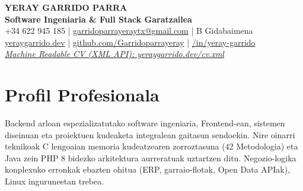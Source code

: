 \documentclass[a4paper,10pt]{article}
\begin{document}
\begin{center}
    {\huge \textbf{YERAY GARRIDO PARRA}} \\ \vspace{4pt}
    {\large \textbf{Software Ingeniaria \& Full Stack Garatzailea}} \\ \vspace{6pt}
    \small
    \faPhone*\hspace{0.5em} +34 622 945 185 \hspace{0.5em} | \hspace{0.5em}
    \faEnvelope \hspace{0.5em} \href{mailto:garridoparrayeraytx@gmail.com}{garridoparrayeraytx@gmail.com} \hspace{0.5em} | \hspace{0.5em}
    \faCar \hspace{0.5em} B Gidabaimena \\ \vspace{3pt}
    \faGlobe \hspace{0.5em} \href{https://yeraygarrido.dev}{yeraygarrido.dev} \hspace{0.5em} | \hspace{0.5em}
    \faGithub \hspace{0.5em} \href{https://github.com/Garridoparrayeray}{github.com/Garridoparrayeray} \hspace{0.5em} | \hspace{0.5em}
    \faLinkedin\href{https://www.linkedin.com/in/yeray-garrido}{/in/yeray-garrido} \\ \vspace{3pt}
    \faCode \textit{ \href{https://yeraygarrido.dev/cv.xml}{Machine Readable CV (XML API): yeraygarrido.dev/cv.xml}}
\end{center}

\vspace{4pt}

\section{Profil Profesionala}
Backend arloan espezializatutako software ingeniaria, Frontend-ean, sistemen diseinuan eta proiektuen kudeaketa integralean gaitasun sendoekin. Nire oinarri teknikoak C lengoaian memoria kudeatzearen zorroztasuna (42 Metodologia) eta Java zein PHP 8 bidezko arkitektura aurreratuak uztartzen ditu. Negozio-logika konplexuko erronkak ebazten ohitua (ERP, garraio-flotak, Open Data APIak), Linux inguruneetan trebea.
\end{document}
